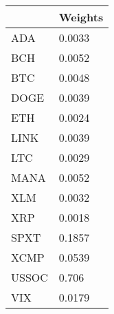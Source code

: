 \begin{tabular}{ll}
\toprule
 & Weights \\
\midrule
ADA & 0.0033 \\
BCH & 0.0052 \\
BTC & 0.0048 \\
DOGE & 0.0039 \\
ETH & 0.0024 \\
LINK & 0.0039 \\
LTC & 0.0029 \\
MANA & 0.0052 \\
XLM & 0.0032 \\
XRP & 0.0018 \\
SPXT & 0.1857 \\
XCMP & 0.0539 \\
USSOC & 0.706 \\
VIX & 0.0179 \\
\bottomrule
\end{tabular}
